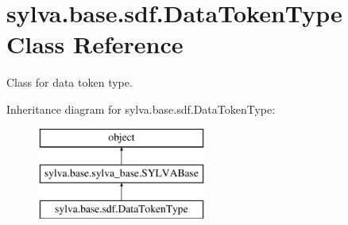 \hypertarget{classsylva_1_1base_1_1sdf_1_1_data_token_type}{}\section{sylva.\+base.\+sdf.\+Data\+Token\+Type Class Reference}
\label{classsylva_1_1base_1_1sdf_1_1_data_token_type}


Class for data token type.  


Inheritance diagram for sylva.\+base.\+sdf.\+Data\+Token\+Type\+:\begin{figure}[H]
\begin{center}
\leavevmode
\includegraphics[height=3.000000cm]{classsylva_1_1base_1_1sdf_1_1_data_token_type}
\end{center}
\end{figure}

